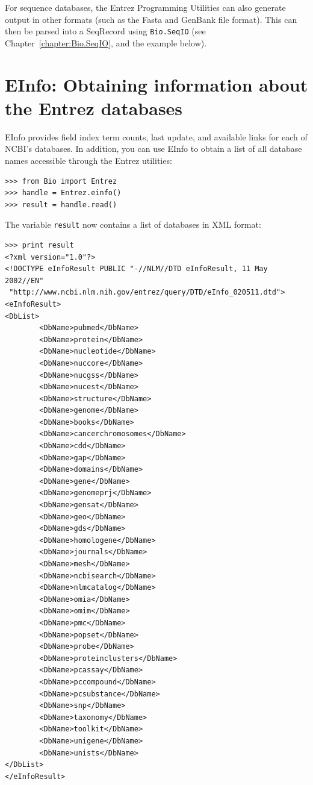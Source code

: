 \documentclass{report}
\begin{document}
For sequence databases, the Entrez Programming Utilities can also generate output in other formats (such as the Fasta and GenBank file format). This can then be parsed into a SeqRecord using \verb+Bio.SeqIO+ (see Chapter~\ref{chapter:Bio.SeqIO}, and the example below).

\section{EInfo: Obtaining information about the Entrez databases}

EInfo provides field index term counts, last update, and available links for each of NCBI's databases. In addition, you can use EInfo to obtain a list of all database names accessible through the Entrez utilities:
\begin{verbatim}
>>> from Bio import Entrez
>>> handle = Entrez.einfo()
>>> result = handle.read()
\end{verbatim}
The variable \verb+result+ now contains a list of databases in XML format:
\begin{verbatim}
>>> print result
<?xml version="1.0"?>
<!DOCTYPE eInfoResult PUBLIC "-//NLM//DTD eInfoResult, 11 May 2002//EN"
 "http://www.ncbi.nlm.nih.gov/entrez/query/DTD/eInfo_020511.dtd">
<eInfoResult>
<DbList>
        <DbName>pubmed</DbName>
        <DbName>protein</DbName>
        <DbName>nucleotide</DbName>
        <DbName>nuccore</DbName>
        <DbName>nucgss</DbName>
        <DbName>nucest</DbName>
        <DbName>structure</DbName>
        <DbName>genome</DbName>
        <DbName>books</DbName>
        <DbName>cancerchromosomes</DbName>
        <DbName>cdd</DbName>
        <DbName>gap</DbName>
        <DbName>domains</DbName>
        <DbName>gene</DbName>
        <DbName>genomeprj</DbName>
        <DbName>gensat</DbName>
        <DbName>geo</DbName>
        <DbName>gds</DbName>
        <DbName>homologene</DbName>
        <DbName>journals</DbName>
        <DbName>mesh</DbName>
        <DbName>ncbisearch</DbName>
        <DbName>nlmcatalog</DbName>
        <DbName>omia</DbName>
        <DbName>omim</DbName>
        <DbName>pmc</DbName>
        <DbName>popset</DbName>
        <DbName>probe</DbName>
        <DbName>proteinclusters</DbName>
        <DbName>pcassay</DbName>
        <DbName>pccompound</DbName>
        <DbName>pcsubstance</DbName>
        <DbName>snp</DbName>
        <DbName>taxonomy</DbName>
        <DbName>toolkit</DbName>
        <DbName>unigene</DbName>
        <DbName>unists</DbName>
</DbList>
</eInfoResult>
\end{verbatim}
\end{document}
